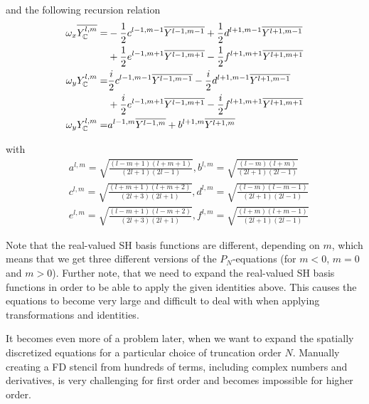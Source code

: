 and the following recursion relation
\begin{align}
\omega_x\overline{Y_{\mathbb{C}}^{l, m}}=
&
-\frac{1}{2}c^{{l-1,m-1}}\overline{Y^{l-1, m-1}}+\frac{1}{2}d^{{l+1,m-1}}\overline{Y^{l+1, m-1}}\\
&
+\frac{1}{2}e^{{l-1,m+1}}\overline{Y^{l-1, m+1}}-\frac{1}{2}f^{{l+1,m+1}}\overline{Y^{l+1, m+1}}\\
\omega_yY_{\mathbb{C}}^{l, m}=
&
\frac{i}{2}c^{{l-1,m-1}}\overline{Y^{l-1, m-1}}-\frac{i}{2}d^{{l+1,m-1}}\overline{Y^{l+1, m-1}}\\
&
+\frac{i}{2}e^{{l-1,m+1}}\overline{Y^{l-1, m+1}}-\frac{i}{2}f^{{l+1,m+1}}\overline{Y^{l+1, m+1}}\\
\omega_yY_{\mathbb{C}}^{l, m}=
&
a^{{l-1,m}}\overline{Y^{l-1, m}}+b^{{l+1,m}}\overline{Y^{l+1, m}}
\end{align}

with 
\begin{align}
&a^{l,m}= \sqrt{\frac{\left(l-m+1\right)\left(l+m+1\right)}{\left(2l+1\right)\left(2l-1\right)}},
b^{l,m}= \sqrt{\frac{\left(l-m\right)\left(l+m\right)}{\left(2l+1\right)\left(2l-1\right)}}\\
&c^{l,m}= \sqrt{\frac{\left(l+m+1\right)\left(l+m+2\right)}{\left(2l+3\right)\left(2l+1\right)}},
d^{l,m}= \sqrt{\frac{\left(l-m\right)\left(l-m-1\right)}{\left(2l+1\right)\left(2l-1\right)}}\\
&e^{l,m}= \sqrt{\frac{\left(l-m+1\right)\left(l-m+2\right)}{\left(2l+3\right)\left(2l+1\right)}},
f^{l,m}= \sqrt{\frac{\left(l+m\right)\left(l+m-1\right)}{\left(2l+1\right)\left(2l-1\right)}}
\end{align}




Note that the real-valued SH basis functions are different, depending on $m$, which means that we get three different versions of the $P_N$-equations (for $m<0$, $m=0$ and $m>0$). Further note, that we need to expand the real-valued SH basis functions in order to be able to apply the given identities above. This causes the equations to become very large and difficult to deal with when applying transformations and identities.

It becomes even more of a problem later, when we want to expand the spatially discretized equations for a particular choice of truncation order $N$. Manually creating a FD stencil from hundreds of terms, including complex numbers and derivatives, is very challenging for first order and becomes impossible for higher order.


